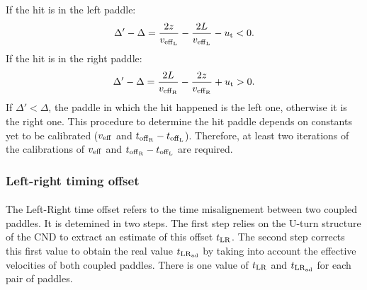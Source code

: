 If the hit is in the left paddle:
\begin{equation}
\Delta'-\Delta= \frac{2z}{v_{\rm{eff}_L}} - \frac{2L}{v_{\rm{eff}_L}} -u_{\rm{t}} <0.
\end{equation}
If the hit is in the right paddle:
\begin{equation}
\Delta'-\Delta= \frac{2L}{v_{\rm{eff}_{\rm{R}}}}-\frac{2z}{v_{\rm{eff}_{\rm{R}}}} +u_{\rm{t}} >0.
\end{equation}
If $\Delta'<\Delta$, the paddle in which the hit happened is the left one, otherwise it is the right one. This procedure to determine the hit paddle depends on constants yet to be calibrated ($v_{\rm{eff}}$ and $t_{\rm{off}_{\rm{R}}}-t_{\rm{off}_{\rm{L}}}$). Therefore, at least two iterations of the calibrations of $v_{\rm{eff}}$ and $t_{\rm{off}_{\rm{R}}}-t_{\rm{off}_{\rm{L}}}$ are required.
\subsubsection{Left-right timing offset }
\paragraph{}
The Left-Right time offset refers to the time misalignement between two coupled paddles. It is detemined in two steps. The first step relies on the U-turn structure of the CND to extract an estimate of this offset $t_{\rm{LR}}$. The second step corrects this first value to obtain the real value $t_{\rm{LR}_{\rm{ad}}}$ by taking into account the effective velocities of both coupled paddles. There is one value of $t_{\rm{LR}}$ and $t_{\rm{LR}_{\rm{ad}}}$ for each pair of paddles. 

